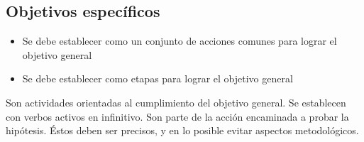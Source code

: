     \subsection{Objetivos específicos }
    
    \begin{itemize}
        \item Se debe establecer como un conjunto de acciones comunes para lograr el objetivo general
        \item Se debe establecer como etapas para lograr el objetivo general
    \end{itemize}
    
    Son actividades orientadas al cumplimiento del objetivo general. Se establecen con verbos activos en infinitivo. Son parte de la acción encaminada a probar la hipótesis. Éstos deben ser precisos, y en lo posible evitar aspectos metodológicos.
